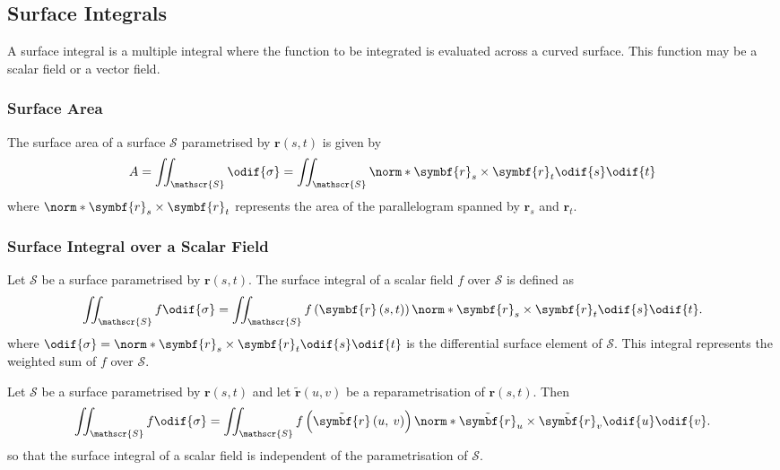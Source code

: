 \documentclass{article}
\begin{document}
\subsection{Surface Integrals}
A surface integral is a multiple integral where the function to be
integrated is evaluated across a curved surface. This function may be a
scalar field or a vector field.
\subsubsection{Surface Area}
The surface area of a surface \(\mathscr{S}\) parametrised by
\(\symbf{r}\left( s, t \right)\) is given by
\begin{equation*}
    A = \iint_{\mathscr{S}} \odif{\sigma} = \iint_{\mathscr{S}} \norm*{\symbf{r}_s \times \symbf{r}_t} \odif{s} \odif{t}
\end{equation*}
where \(\norm*{\symbf{r}_s \times \symbf{r}_t}\) represents the area of
the parallelogram spanned by \(\symbf{r}_s\) and \(\symbf{r}_t\).
\subsubsection{Surface Integral over a Scalar Field}
Let \(\mathscr{S}\) be a surface parametrised by \(\symbf{r}\left( s, t
\right)\). The surface integral of a scalar field \(f\) over
\(\mathscr{S}\) is defined as
\begin{equation*}
    \iint_{\mathscr{S}} f \odif{\sigma} = \iint_{\mathscr{S}} f\left( \symbf{r}\left( s, t \right) \right) \norm*{\symbf{r}_s \times \symbf{r}_t} \odif{s} \odif{t}.
\end{equation*}
where \(\odif{\sigma} = \norm*{\symbf{r}_s \times \symbf{r}_t} \odif{s}\odif{t}\)
is the differential surface element of \(\mathscr{S}\).
This integral represents the weighted sum of \(f\) over \(\mathscr{S}\).
\begin{lemma}
    Let \(\mathscr{S}\) be a surface parametrised by \(\symbf{r}\left( s, t \right)\)
    and let \(\tilde{\symbf{r}}\left( u, v \right)\) be a reparametrisation
    of \(\symbf{r}\left( s, t \right)\). Then
    \begin{equation*}
        \iint_{\mathscr{S}} f \odif{\sigma} = \iint_{\mathscr{S}} f\left( \tilde{\symbf{r}}\left( u,\: v \right) \right) \norm*{\tilde{\symbf{r}}_u \times \tilde{\symbf{r}}_v} \odif{u} \odif{v}.
    \end{equation*}
    so that the surface integral of a scalar field is independent of the
    parametrisation of \(\mathscr{S}\).
\end{lemma}
\end{document}

